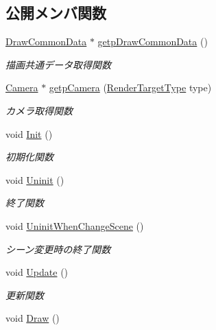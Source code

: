 \subsection*{公開メンバ関数}
\begin{DoxyCompactItemize}
\item 
\mbox{\hyperlink{class_draw_common_data}{Draw\+Common\+Data}} $\ast$ \mbox{\hyperlink{class_draw_manager_a92e7e6d7c9a8f55804ae375f79fb0107}{getp\+Draw\+Common\+Data}} ()
\begin{DoxyCompactList}\small\item\em 描画共通データ取得関数 \end{DoxyCompactList}\item 
\mbox{\hyperlink{class_camera}{Camera}} $\ast$ \mbox{\hyperlink{class_draw_manager_ac378ded8b0ef8c4fec3215b0a948680b}{getp\+Camera}} (\mbox{\hyperlink{class_draw_manager_a7ade407aee706c02454da2e53a559c9c}{Render\+Target\+Type}} type)
\begin{DoxyCompactList}\small\item\em カメラ取得関数 \end{DoxyCompactList}\item 
void \mbox{\hyperlink{class_draw_manager_a3cb9319d492285bd9dfc983d27e5d04f}{Init}} ()
\begin{DoxyCompactList}\small\item\em 初期化関数 \end{DoxyCompactList}\item 
void \mbox{\hyperlink{class_draw_manager_ae58095d9d734f30211011e9205aa57aa}{Uninit}} ()
\begin{DoxyCompactList}\small\item\em 終了関数 \end{DoxyCompactList}\item 
void \mbox{\hyperlink{class_draw_manager_a8b4ea38d625efbcc08d9b168cb5465f9}{Uninit\+When\+Change\+Scene}} ()
\begin{DoxyCompactList}\small\item\em シーン変更時の終了関数 \end{DoxyCompactList}\item 
void \mbox{\hyperlink{class_draw_manager_af498c44ff698bf3ef473df970e24c917}{Update}} ()
\begin{DoxyCompactList}\small\item\em 更新関数 \end{DoxyCompactList}\item 
void \mbox{\hyperlink{class_draw_manager_a43372495e68d77a2698f211cf921b37e}{Draw}} ()

\end{DoxyCompactItemize}
